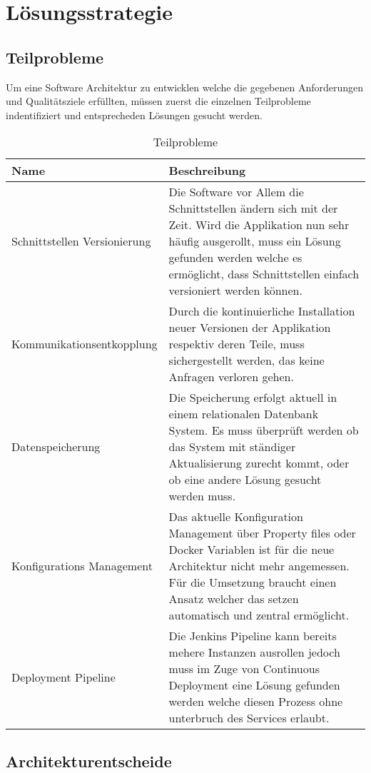 \chapter{Lösungsstrategie}

\section{Teilprobleme}	

Um eine Software Architektur zu entwicklen welche die gegebenen Anforderungen und Qualitätsziele erfüllten, müssen zuerst die einzelnen Teilprobleme indentifiziert und entsprecheden Lösungen gesucht werden.

\begin{table}[H]
	\centering
	\caption{Teilprobleme}
	\begin{tabular}{ | p{4cm} | p{12cm} | }
		\toprule
		{\textbf{Name}} & {\textbf{Beschreibung}} \\
		\midrule
		Schnittstellen Versionierung & Die Software vor Allem die Schnittstellen ändern sich mit der Zeit. Wird die Applikation nun sehr häufig ausgerollt, muss ein Lösung gefunden werden welche es ermöglicht, dass Schnittstellen einfach versioniert werden können.\\ \hline
		Kommunikationsentkopplung &  Durch die kontinuierliche Installation neuer Versionen der Applikation respektiv deren Teile, muss sichergestellt werden, das keine Anfragen verloren gehen.\\ \hline
		Datenspeicherung &  Die Speicherung erfolgt aktuell in einem relationalen Datenbank System. Es muss überprüft werden ob das System mit ständiger Aktualisierung zurecht kommt, oder ob eine andere Lösung gesucht werden muss.\\ \hline
		Konfigurations Management & Das aktuelle Konfiguration Management über Property files oder Docker Variablen ist für die neue Architektur nicht mehr angemessen. Für die Umsetzung braucht einen Ansatz welcher das setzen automatisch und zentral ermöglicht. \\ \hline
		Deployment Pipeline & Die Jenkins Pipeline kann bereits mehere Instanzen ausrollen jedoch muss im Zuge von Continuous Deployment eine Lösung gefunden werden welche diesen Prozess ohne unterbruch des Services erlaubt. \\
		\bottomrule
	\end{tabular}
\end{table}

\section{Architekturentscheide}

